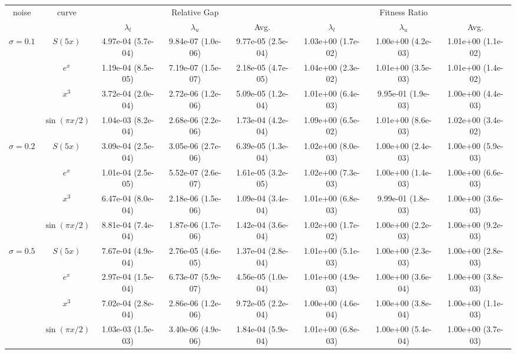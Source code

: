 \begin{tabular}{cccccccc}
\toprule
\multirow{2}{*}{noise} & \multirow{2}{*}{curve}&\multicolumn{3}{c}{Relative Gap}&\multicolumn{3}{c}{Fitness Ratio}\tabularnewline
\cmidrule(lr){3-5}
\cmidrule(lr){6-8}
&&$\lambda_l$&$\lambda_u$&Avg.&$\lambda_l$&$\lambda_u$&Avg.\tabularnewline
\midrule
\multirow{4}{*}{$\sigma = 0.1$}&$S(5x)$& 4.97e-04 (5.7e-04)& 9.84e-07 (1.0e-06)& 9.77e-05 (2.5e-04)& 1.03e+00 (1.7e-02)& 1.00e+00 (4.2e-03)& 1.01e+00 (1.1e-02)\tabularnewline
&$e^x$& 1.19e-04 (8.5e-05)& 7.19e-07 (1.5e-07)& 2.18e-05 (4.7e-05)& 1.04e+00 (2.3e-02)& 1.01e+00 (3.5e-03)& 1.01e+00 (1.4e-02)\tabularnewline
&$x^3$& 3.72e-04 (2.0e-04)& 2.72e-06 (1.2e-06)& 5.09e-05 (1.2e-04)& 1.01e+00 (6.4e-03)& 9.95e-01 (1.9e-03)& 1.00e+00 (4.4e-03)\tabularnewline
&$\sin(\pi x/2)$& 1.04e-03 (8.2e-04)& 2.68e-06 (2.2e-06)& 1.73e-04 (4.2e-04)& 1.09e+00 (6.5e-02)& 1.01e+00 (8.6e-03)& 1.02e+00 (3.4e-02)\tabularnewline
\midrule
\multirow{4}{*}{$\sigma = 0.2$}&$S(5x)$& 3.09e-04 (2.5e-04)& 3.05e-06 (2.7e-06)& 6.39e-05 (1.3e-04)& 1.02e+00 (8.0e-03)& 1.00e+00 (2.4e-03)& 1.00e+00 (5.9e-03)\tabularnewline
&$e^x$& 1.01e-04 (2.5e-05)& 5.52e-07 (2.6e-07)& 1.61e-05 (3.2e-05)& 1.02e+00 (7.3e-03)& 1.00e+00 (1.4e-03)& 1.00e+00 (6.6e-03)\tabularnewline
&$x^3$& 6.47e-04 (8.0e-04)& 2.18e-06 (1.5e-06)& 1.09e-04 (3.4e-04)& 1.01e+00 (6.8e-03)& 9.99e-01 (1.8e-03)& 1.00e+00 (3.6e-03)\tabularnewline
&$\sin(\pi x/2)$& 8.81e-04 (7.4e-04)& 1.87e-06 (1.7e-06)& 1.42e-04 (3.6e-04)& 1.02e+00 (1.7e-02)& 1.00e+00 (2.2e-03)& 1.00e+00 (9.2e-03)\tabularnewline
\midrule
\multirow{4}{*}{$\sigma = 0.5$}&$S(5x)$& 7.67e-04 (4.9e-04)& 2.76e-05 (4.6e-05)& 1.37e-04 (2.8e-04)& 1.01e+00 (5.1e-03)& 1.00e+00 (2.3e-03)& 1.00e+00 (2.8e-03)\tabularnewline
&$e^x$& 2.97e-04 (1.5e-04)& 6.73e-07 (5.9e-07)& 4.56e-05 (1.0e-04)& 1.01e+00 (4.9e-03)& 1.00e+00 (3.6e-04)& 1.00e+00 (3.8e-03)\tabularnewline
&$x^3$& 7.02e-04 (2.8e-04)& 2.86e-06 (1.2e-06)& 9.72e-05 (2.2e-04)& 1.00e+00 (4.6e-04)& 1.00e+00 (3.8e-04)& 1.00e+00 (1.1e-03)\tabularnewline
&$\sin(\pi x/2)$& 1.03e-03 (1.5e-03)& 3.40e-06 (4.9e-06)& 1.84e-04 (5.9e-04)& 1.01e+00 (6.8e-03)& 1.00e+00 (5.4e-04)& 1.00e+00 (3.7e-03)\tabularnewline
\bottomrule
\end{tabular}
